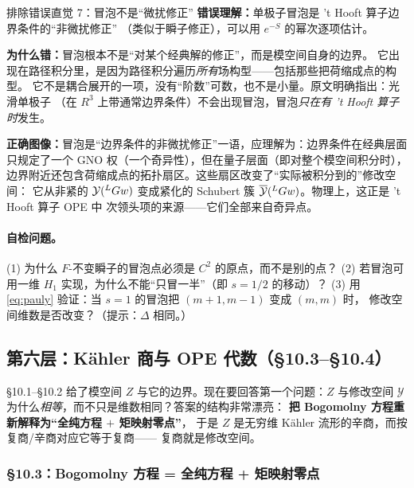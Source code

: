 \begin{kcard}{排除错误直觉 7：冒泡不是“微扰修正”}
\textbf{错误理解：}单极子冒泡是 't Hooft{} 算子边界条件的“非微扰修正”
（类似于瞬子修正），可以用 $e^{-S}$ 的幂次逐项估计。

\textbf{为什么错：}冒泡根本不是“对某个经典解的修正”，而是模空间自身的边界。
它出现在路径积分里，是因为路径积分遍历\emph{所有}场构型——包括那些把荷缩成点的构型。
它不是耦合展开的一项，没有“阶数”可数，也不是小量。原文明确指出：光滑单极子
（在 $R^3$ 上带通常边界条件）不会出现冒泡，冒泡\emph{只在有 't Hooft{} 算子时}发生。
\pA{}

\textbf{正确图像：}冒泡是“边界条件的非微扰修正”一语，应理解为：边界条件在经典层面
只规定了一个 GNO 权（一个奇异性），但在量子层面（即对整个模空间积分时），
边界附近还包含荷缩成点的拓扑扇区。这些扇区改变了“实际被积分到的”修改空间：
它从非紧的 $\mathcal{Y}({}^{L}G w)$ 变成紧化的 Schubert 簇
$\overline{\mathcal{Y}}({}^{L}G w)$。物理上，这正是 't Hooft{} 算子 OPE 中
次领头项的来源——它们全部来自奇异点。
\end{kcard}

\paragraph{自检问题。}
(1) 为什么 $F$-不变瞬子的冒泡点必须是 $C^2$ 的原点，而不是别的点？
(2) 若冒泡可用一维 $H_1$ 实现，为什么不能“只冒一半”（即 $s=1/2$ 的移动）？
(3) 用 \eqref{eq:pauly} 验证：当 $s=1$ 的冒泡把 $(m+1,m-1)$ 变成 $(m,m)$ 时，
修改空间维数是否改变？（提示：$\Delta$ 相同。）


\subsection{第六层：Kähler 商与 OPE 代数（§10.3--§10.4）}
\label{sec:flesh-hecke-kahler}

§10.1--§10.2 给了模空间 $Z$ 与它的边界。现在要回答第一个问题：$Z$ 与修改空间
$\mathcal{Y}$ 为什么\emph{相等}，而不只是维数相同？答案的结构非常漂亮：
\textbf{把 Bogomolny 方程重新解释为“全纯方程 $+$ 矩映射零点”}，
于是 $Z$ 是无穷维 Kähler 流形的辛商，而按复商/辛商对应它等于复商——
复商就是修改空间。

\subsubsection{§10.3：Bogomolny 方程 = 全纯方程 + 矩映射零点}


